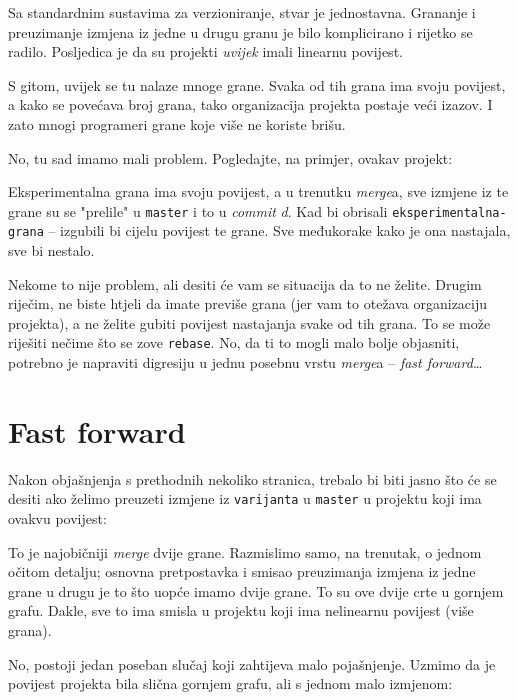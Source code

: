 Sa standardnim sustavima za verzioniranje, stvar je jednostavna. 
Grananje i preuzimanje izmjena iz jedne u drugu granu je bilo komplicirano i rijetko se radilo. 
Posljedica je da su projekti \emph{uvijek} imali linearnu povijest.



S gitom, uvijek se tu nalaze mnoge grane.
Svaka od tih grana ima svoju povijest, a kako se povećava broj grana, tako organizacija projekta postaje veći izazov.
I zato mnogi programeri grane koje više ne koriste brišu.

No, tu sad imamo mali problem.
Pogledajte, na primjer, ovakav projekt:



Eksperimentalna grana ima svoju povijest, a u trenutku \emph{merge}a, sve izmjene iz te grane su se "prelile" u \verb+master+ i to u \emph{commit} \emph d.
Kad bi obrisali \verb+eksperimentalna-grana+ -- izgubili bi cijelu povijest te grane.
Sve međukorake kako je ona nastajala, sve bi nestalo.

Nekome to nije problem, ali desiti će vam se situacija da to ne želite.
Drugim riječim, ne biste htjeli da imate previše grana (jer vam to otežava organizaciju projekta), a ne želite gubiti povijest nastajanja svake od tih grana.
To se može riješiti nečime što se zove \verb+rebase+.
No, da ti to mogli malo bolje objasniti, potrebno je napraviti digresiju u jednu posebnu vrstu \emph{merge}a -- \emph{fast forward}\dots

\section*{Fast forward}

Nakon objašnjenja s prethodnih nekoliko stranica, trebalo bi biti jasno što će se desiti ako želimo preuzeti izmjene iz \verb+varijanta+ u \verb+master+ u projektu koji ima ovakvu povijest:



To je najobičniji \emph{merge} dvije grane.
Razmislimo samo, na trenutak, o jednom očitom detalju;
osnovna pretpostavka i smisao preuzimanja izmjena iz jedne grane u drugu je to što uopće imamo dvije grane.
To su ove dvije crte u gornjem grafu.
Dakle, sve to ima smisla u projektu koji ima nelinearnu povijest (više grana).

No, postoji jedan poseban slučaj koji zahtijeva malo pojašnjenje.
Uzmimo da je povijest projekta bila slična gornjem grafu, ali s jednom malo izmjenom:

